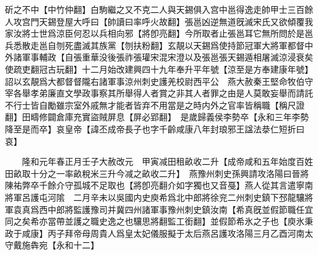 斫之不中【中竹仲翻】白駒繼之又不克二人與天錫俱入宫中邕得逸走帥甲士三百餘人攻宫門天錫登屋大呼曰【帥讀曰率呼火故翻】張邕凶逆無道旣滅宋氏又欲傾覆我家汝將士世爲涼臣何忍以兵相向邪【將卽亮翻】今所取者止張邕耳它無所問於是邕兵悉散走邕自刎死盡滅其族黨【刎扶粉翻】玄靚以天錫爲使持節冠軍大將軍都督中外諸軍事輔政【自張重華没後張祚張瓘宋混宋澄以及張邕張天錫遁相屠滅涼浸衰矣使疏吏翻冠古玩翻】十二月始改建興四十九年奉升平年號【涼至是方奉建康年號】詔以玄靚爲大都督督隴右諸軍事涼州刺史護羌校尉西平公　燕大赦秦王堅命牧伯守宰各舉孝弟廉直文學政事察其所舉得人者賞之非其人者罪之由是人莫敢妄舉而請託不行士皆自勵雖宗室外戚無才能者皆弃不用當是之時内外之官率皆稱職【稱尺證翻】田疇修闢倉庫充實盜賊屏息【屏必郢翻】　是歲歸義侯李勢卒【永和三年李勢降至是而卒】哀皇帝【諱丕成帝長子也字千齡咸康八年封琅邪王諡法㳟仁短折曰哀】

　　隆和元年春正月壬子大赦改元　甲寅减田租畝收二升【成帝咸和五年始度百姓田畝取十分之一率畝稅米三升今减之畝收二升】　燕豫州刺史孫興請攻洛陽曰晉將陳祐弊卒千餘介守孤城不足取也【將卽亮翻介如字獨也又音戞】燕人從其言遣寧南將軍呂護屯河隂　二月辛未以吳國内史庾希爲北中郎將徐兖二州刺史鎮下邳龍驤將軍袁真爲西中郎將監護豫司并冀四州諸軍事豫州刺史鎮汝南【希真旣並假節職任宜同之矣希亦當帶並護之職史逸之也驤思將翻監工銜翻】並假節希氷之子也【庾氷秉政于咸康】丙子拜帝母周貴人爲皇太妃儀服擬于太后燕呂護攻洛陽三月乙酉河南太守戴施犇宛【永和十二】

